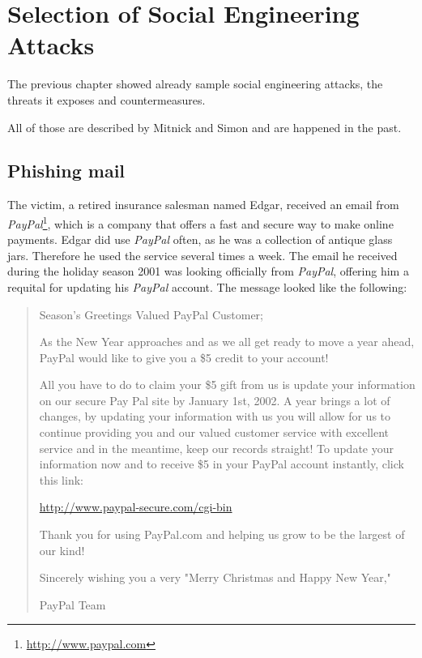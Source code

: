 \chapter{Selection of Social Engineering Attacks}
\label{chapter:attacks}

The previous chapter showed already sample social engineering attacks, the
threats it exposes and countermeasures. 


All of those are described by Mitnick and Simon \cite{mitnick2003}
and are happened in the past.

\section{Phishing mail}
\label{sec:phishing_mail}

The victim, a retired insurance salesman named Edgar, received an email from
\textit{PayPal}\footnote{\url{http://www.paypal.com}}, which is a company that
offers a fast and secure way to make online payments. Edgar did use
\textit{PayPal} often, as he was a collection of antique glass jars. Therefore
he used the service several times a week. The email he received during the
holiday season 2001 was looking officially
from \textit{PayPal}, offering him a requital for updating his
\textit{PayPal} account. The message looked like the following:

\begin{quote}
Season's Greetings Valued PayPal Customer;

As the New Year approaches and as we all get ready to move a year ahead,
PayPal would like to give you a \$5 credit to your account!

All you have to do to claim your \$5 gift from us is update your information on
our secure Pay Pal site by January 1st, 2002. A year brings a lot of changes,
by updating your information with us you will allow for us to continue
providing you and our valued customer service with excellent service and in the
meantime, keep our records straight! To update your information now and to
receive \$5 in your PayPal account instantly, click this link:

\url{http://www.paypal-secure.com/cgi-bin}

Thank you for using PayPal.com and helping us grow to be the largest of our
kind!

Sincerely wishing you a very "Merry Christmas and Happy New Year,"

PayPal Team

\end{quote}

